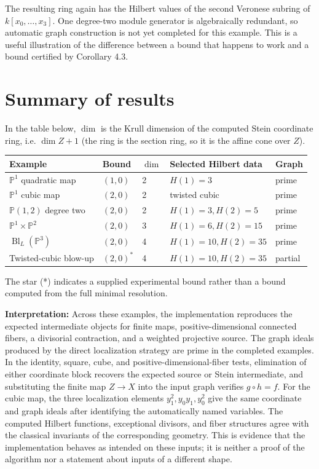 \documentclass[11pt,reqno]{amsart}
\newcommand{\PP}{\ensuremath{\mathbb{P}}}
\DeclareMathOperator{\Bl}{Bl}
\theoremstyle{plain}
\theoremstyle{definition}
\begin{document}
The resulting ring again has the Hilbert values of the second Veronese
subring of \(k[x_0,\dots,x_3]\). One degree-two module generator is algebraically redundant,
so automatic graph construction is not yet completed for this example.
This is a useful illustration of the difference between a bound that
happens to work and a bound certified by Corollary 4.3.

\section{Summary of results}\label{sec:summary}

In the table below, \(\dim\) is the Krull dimension of the computed
Stein coordinate ring, i.e. \(\dim Z+1\) (the ring is the section ring,
so it is the affine cone over \(Z\)).

\begin{longtable}[]{@{}lllll@{}}
\toprule\noalign{}
Example & Bound & \(\dim\) & Selected Hilbert data & Graph \\
\midrule\noalign{}
\endhead
\bottomrule\noalign{}
\endlastfoot
\(\PP^1\) quadratic map & \((1,0)\) & 2 & \(H(1)=3\) & prime \\
\(\PP^1\) cubic map & \((2,0)\) & 2 & twisted cubic & prime \\
\(\PP(1,2)\) degree two & \((2,0)\) & 2 & \(H(1)=3,H(2)=5\) & prime \\
\(\PP^1\times\PP^2\) & \((2,0)\) & 3 & \(H(1)=6,H(2)=15\) & prime \\
\(\Bl_L(\PP^3)\) & \((2,0)\) & 4 & \(H(1)=10,H(2)=35\) & prime \\
Twisted-cubic blow-up & \((2,0)^*\) & 4 & \(H(1)=10,H(2)=35\) &
partial \\
\end{longtable}

The star (*) indicates a supplied experimental bound rather than a bound
computed from the full minimal resolution.

\textbf{Interpretation:} Across these examples, the implementation
reproduces the expected intermediate objects for finite maps,
positive-dimensional connected fibers, a divisorial contraction, and a
weighted projective source. The
graph ideals produced by the direct localization strategy are prime in
the completed examples. In the identity, square, cube, and
positive-dimensional-fiber tests, elimination of either coordinate block
recovers the expected source or Stein intermediate, and substituting the
finite map \(Z\to X\) into the input graph verifies \(g\circ h=f\). For the
cubic map, the three localization elements \(y_1^2,y_0y_1,y_0^2\) give the
same coordinate and graph ideals after identifying the automatically named
variables. The computed Hilbert functions, exceptional
divisors, and fiber structures agree with the classical invariants of
the corresponding geometry. This is evidence that the implementation
behaves as intended on these inputs; it is neither a proof of the
algorithm nor a statement about inputs of a different shape.
\end{document}
